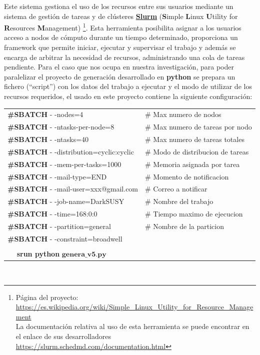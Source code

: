 Este sistema gestiona el uso de los recursos entre sus usuarios mediante un sistema de gestión de tareas y de clús\-te\-res
\href{https://es.wikipedia.org/wiki/Simple\_Linux\_Utility\_for\_Resource\_Management}{\textbf{Slurm}} (\textbf{S}imple \-\textbf{L}inux \-\textbf{U}tility for \textbf{R}e\-sour\-ces \-\textbf{M}ana\-ge\-ment)
\footnote{Página del proyecto: \href{https://es.wikipedia.org/wiki/Simple\_Linux\_Utility\_for\_Resource\_Management}{https://es.wikipedia.org/wiki/Simple\_Linux\_Utility\_for\_Resource\_Management}\\
La documentación relativa al uso de esta herramienta se puede encontrar en el enlace de sus desarrolladores \href{https://slurm.schedmd.com/documentation.html}{https://slurm.schedmd.com/documentation.html}}. 
Esta herramienta posibilita asignar a los usuarios acceso a nodos de cómputo durante un tiempo determinado, proporciona un framework que permite iniciar, ejecutar y supervisar el trabajo y además se encarga de arbitrar la necesidad de recursos, administrando una cola de tareas pendiente. Para el caso que nos ocupa en nuestra investigación, para poder paralelizar el proyecto de generación desarrollado en \textbf{python} se prepara un fichero (``script'') con los datos del trabajo a ejecutar y el modo de utilizar de los recursos requeridos, el usado en este proyecto contiene la siguiente configuración:\\[.2cm] %
\begin{tabular}{|ll|}
\hline
\textbf{\#SBATCH} - -nodes=4                    &\# Max numero de nodos\\
\textbf{\#SBATCH} - -ntasks-per-node=8          &\# Max numero de tareas por nodo\\
\textbf{\#SBATCH} - -ntasks=40                  &\# Max numero de tareas totales\\
\textbf{\#SBATCH} - -distribution=cyclic:cyclic &\# Modo de distribucion de tareas\\
\textbf{\#SBATCH} - -mem-per-tasks=1000         &\# Memoria asignada por tarea\\
\textbf{\#SBATCH} - -mail-type=END              &\# Momento de notificacion\\
\textbf{\#SBATCH} - -mail-user=xxx@gmail.com    &\# Correo a notificar\\
\textbf{\#SBATCH} - -job-name=DarkSUSY          &\# Nombre del trabajo\\
\textbf{\#SBATCH} - -time=168:0:0               &\# Tiempo maximo de ejecucion\\
\textbf{\#SBATCH} - -partition=general          &\# Nombre de la particion\\
\textbf{\#SBATCH} - -constraint=broadwell       & \\
& \\[-.6cm]
~~ \textbf{srun python} $\mathbf{genera\_v5.py}$ & \\
\hline
\end{tabular}\\[.2cm]


